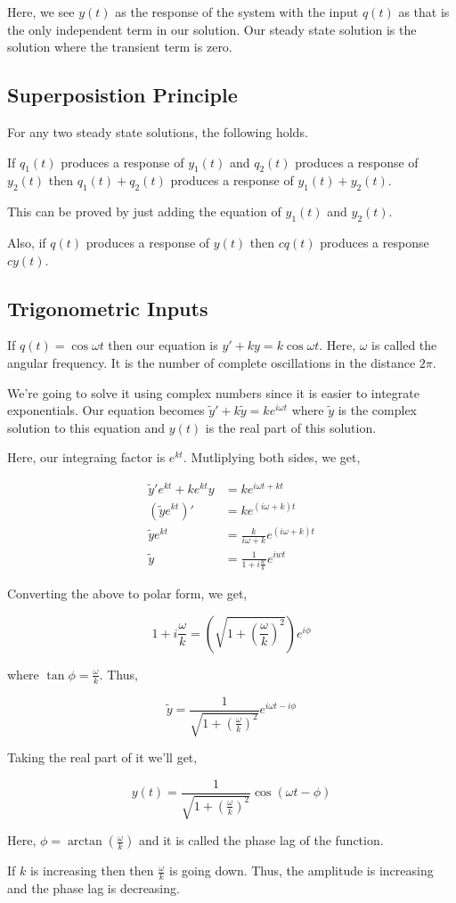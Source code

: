 Here, we see $y(t)$ as the response of the system with the input $q(t)$ as that is the only independent term in our solution.
Our steady state solution is the solution where the transient term is zero.

\subsection{Superposistion Principle}

For any two steady state solutions, the following holds.

If $q_1(t)$ produces a response of $y_1(t)$ 
and $q_2(t)$ produces a response of $y_2(t)$ 
then $q_1(t) + q_2(t)$ produces a response of $y_1(t) + y_2(t)$.

This can be proved by just adding the equation of $y_1(t)$ and $y_2(t)$.

Also, if $q(t)$ produces a response of $y(t)$ 
then $cq(t)$ produces a response $cy(t)$.


\subsection{Trigonometric Inputs}

If $q(t) = \cos \omega t$ then our equation is $y' + ky = k \cos \omega t$.
Here, $\omega$ is called the angular frequency.
It is the number of complete oscillations in the distance $2 \pi$.

We're going to solve it using complex numbers since it is easier to integrate exponentials.
Our equation becomes $\tilde{y}' + k\tilde{y} = k e^{i \omega t}$
where $\tilde{y}$ is the complex solution to this equation and $y(t)$ is the real part of this solution.

Here, our integraing factor is $e^{kt}$.
Mutliplying both sides, we get, 

\begin{align*}
	\tilde{y}' e^{kt} + k e^{kt} y & = k e^{i \omega t + kt} \\
	(\tilde{y} e^{kt})' & = k e^{(i \omega + k) t} \\
	\tilde{y} e^{kt} & =\frac{k}{i \omega + k} e^{(i \omega + k) t} \\
	\tilde{y} & = \frac{1}{1 + i \frac{w}{k}} e^{iwt}
\end{align*}

Converting the above to polar form, we get, 

$$ 1 + i \frac{\omega}{k} = \left( \sqrt{ 1 + \left( \frac{\omega}{k} \right)^2 } \right) e^{i \phi} $$

where $\tan \phi = \frac{\omega}{k}$. Thus, 

$$ \tilde{y} = \frac{1}{\sqrt{ 1 + \left( \frac{\omega}{k} \right)^2 }} e^{i \omega t - i \phi} $$

Taking the real part of it we'll get, 

$$ y(t) = \frac{1}{\sqrt{ 1 + \left( \frac{\omega}{k} \right)^2 }} \cos(\omega t - \phi) $$

Here, $\phi = \arctan \left( \frac{\omega}{k} \right)$ and it is called the phase lag of the function.

If $k$ is increasing then then $\frac{\omega}{k}$ is going down.
Thus, the amplitude is increasing and the phase lag is decreasing.


